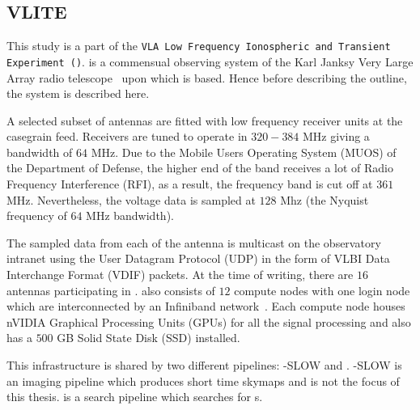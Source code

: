 \subsection{VLITE}

\par This study is a part of the \texttt{VLA Low Frequency Ionospheric and Transient Experiment (\vlite)}. 
\vlite is a commensual observing system of the Karl Janksy Very Large Array radio telescope~\cite{vla} upon which \vf is based. 
Hence before describing the outline, the \vlite system is described here.

\par A selected subset of \vla antennas are fitted with low frequency receiver units at the casegrain feed. 
Receivers are tuned to operate in $320-384$ MHz giving a bandwidth of $64$ MHz. Due to the Mobile Users Operating System (MUOS) of the Department of Defense, the higher end of the band receives a lot of Radio Frequency Interference (RFI), as a result, the frequency band is cut off at $361$ MHz. Nevertheless, the voltage data is sampled at $128$ Mhz (the Nyquist frequency of $64$ MHz bandwidth).
\par The sampled data from each of the antenna is multicast on the observatory intranet using the User Datagram Protocol (UDP) in the form of VLBI Data Interchange Format (VDIF) packets. At the time of writing, there are $16$ \vla antennas participating in \vlite. \vlite also consists of $12$ compute nodes with one login node which are interconnected by an Infiniband network~\cite{infiniband}. 
Each compute node houses nVIDIA Graphical Processing Units (GPUs) for all the signal processing and also has a $500$ GB Solid State Disk (SSD) installed.

\par This infrastructure is shared by two different pipelines: \vlite-SLOW and \vf. \vlite-SLOW is an imaging pipeline which produces short time skymaps and is not the focus of this thesis. \vf is a search pipeline which searches for \frb{}s.

